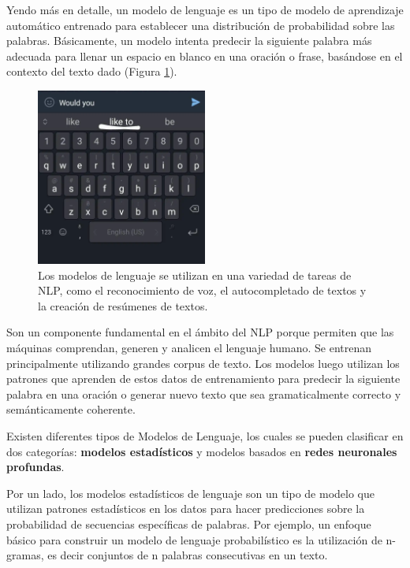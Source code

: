 Yendo más en detalle, un modelo de lenguaje es un tipo de modelo de aprendizaje automático entrenado para establecer una distribución de probabilidad sobre las palabras. Básicamente, un modelo intenta predecir la siguiente palabra más adecuada para llenar un espacio en blanco en una oración o frase, basándose en el contexto del texto dado (Figura \ref{fig:nlp}).

\begin{figure}[H]
    \centering
    \includegraphics[width=0.5\textwidth]{imagenes/autocompletado_celular.jpg}
    \caption{Los modelos de lenguaje se utilizan en una variedad de tareas de NLP, como el reconocimiento de voz, el autocompletado de textos y la creación de resúmenes de textos.}
    \label{fig:nlp}
\end{figure}

Son un componente fundamental en el ámbito del NLP porque permiten que las máquinas comprendan, generen y analicen el lenguaje humano. Se entrenan principalmente utilizando grandes corpus de texto. Los modelos luego utilizan los patrones que aprenden de estos datos de entrenamiento para predecir la siguiente palabra en una oración o generar nuevo texto que sea gramaticalmente correcto y semánticamente coherente.

Existen diferentes tipos de Modelos de Lenguaje, los cuales se pueden clasificar en dos categorías: \textbf{modelos estadísticos} y modelos basados en \textbf{redes neuronales profundas}.

Por un lado, los modelos estadísticos de lenguaje son un tipo de modelo que utilizan patrones estadísticos en los datos para hacer predicciones sobre la probabilidad de secuencias específicas de palabras. Por ejemplo, un enfoque básico para construir un modelo de lenguaje probabilístico es la utilización de n-gramas, es decir conjuntos de n palabras consecutivas en un texto.

